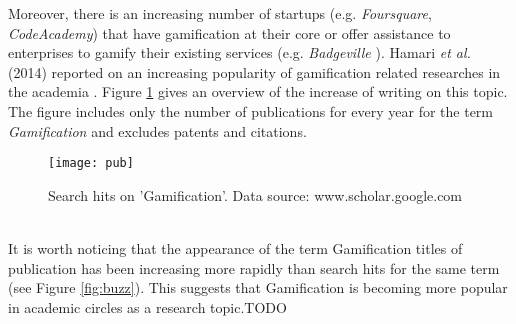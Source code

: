Moreover, there is an increasing number of startups (e.g. \textit{Foursquare}, \textit{CodeAcademy}) that have gamification  at  their  core \cite{codeacademy} or offer assistance to enterprises to gamify their existing services (e.g. \textit{Badgeville} \cite{badgeville}). Hamari \textit{et al.} (2014) reported on an increasing popularity of gamification related researches in the academia \cite{hamari2014does}. Figure \ref{fig:pub} gives an overview of the increase of writing on this topic. The figure includes only the number of publications for every year for the term \textit{Gamification} and excludes patents and citations. 
\begin{figure}[h]
    \centering
    \texttt{[image: pub]}
    \caption{Search hits on 'Gamification'. Data source: www.scholar.google.com}
    \label{fig:pub}
\end{figure}\\
It is worth noticing that the appearance of the term Gamification titles of publication has been increasing more rapidly than search hits for the same term (see Figure \ref{fig:buzz}). This suggests that Gamification is becoming more popular in academic circles as a research topic.TODO%

